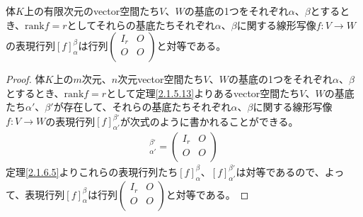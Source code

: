 \documentclass[dvipdfmx]{jsarticle}
\begin{document}
\begin{thm}\label{2.1.6.5}
体$K$上の有限次元のvector空間たち$V$、$W$の基底の1つをそれぞれ$\alpha$、$\beta$とするとき、${\mathrm{rank}}f = r$としてそれらの基底たちそれぞれ$\alpha$、$\beta$に関する線形写像$f:V \rightarrow W$の表現行列$[ f]^{\beta}_{\alpha}$は行列$\begin{pmatrix}
I_{r} & O \\
O & O \\
\end{pmatrix}$と対等である。
\end{thm}
\begin{proof}
体$K$上の$m$次元、$n$次元vector空間たち$V$、$W$の基底の1つをそれぞれ$\alpha$、$\beta$とするとき、${\mathrm{rank}}f = r$として定理\ref{2.1.5.13}よりあるvector空間たち$V$、$W$の基底たち$\alpha'$、$\beta'$が存在して、それらの基底たちそれぞれ$\alpha$、$\beta$に関する線形写像$f:V \rightarrow W$の表現行列$[ f]^{\beta'}_{\alpha'}$が次式のように書かれることができる。
\begin{align*}
[ f]^{\beta'}_{\alpha'} = \begin{pmatrix}
I_{r} & O \\
O & O \\
\end{pmatrix}
\end{align*}
定理\ref{2.1.6.5}よりこれらの表現行列たち$[ f]^{\beta}_{\alpha}$、$[ f]^{\beta'}_{\alpha'}$は対等であるので、よって、表現行列$[ f]^{\beta}_{\alpha}$は行列$\begin{pmatrix}
I_{r} & O \\
O & O \\
\end{pmatrix}$と対等である。
\end{proof}
\end{document}
